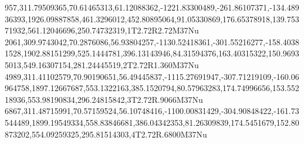 957,311.79509365,70.61465313,61.12088362,-1221.83300489,-261.86107371,-134.48936393,1926.09887858,461.3296012,452.80895064,91.05330869,176.65378918,139.75371932,561.12046696,250.74732319,1T2.72R2.72M37Nu
2061,309.9743042,70.2876086,56.93804257,-1130.52418361,-301.55216277,-158.40381528,1902.88151299,525.1444781,396.13143946,84.31594376,163.40315322,150.96935013,549.16307154,281.24445519,2T2.72R1.360M37Nu
4989,311.41102579,70.90190651,56.49445837,-1115.27691947,-307.71219109,-160.06964758,1897.12667687,553.1322163,385.1520794,80.57963283,174.74996656,153.55218936,553.98190834,296.24815842,3T2.72R.9066M37Nu
6867,311.48715991,70.57159524,56.10748416,-1100.00831429,-304.90848422,-161.73544489,1899.19549334,558.83846681,386.04342353,81.26309839,174.5451679,152.80873202,554.09259325,295.81514303,4T2.72R.6800M37Nu
